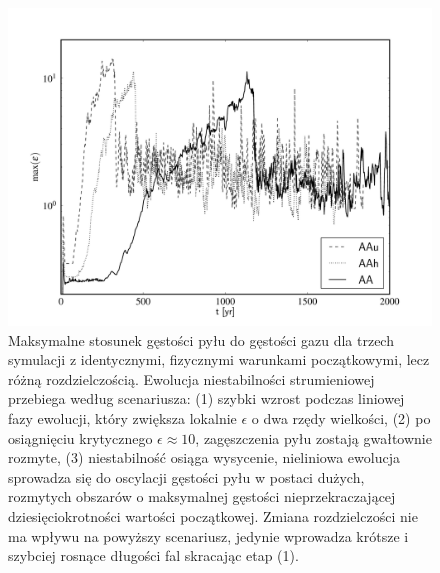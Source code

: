 \begin{figure}
   \includegraphics[width=0.98\linewidth]{figures/fig4}
   \caption{
      Maksymalne stosunek gęstości pyłu do gęstości gazu dla trzech symulacji z
      identycznymi, fizycznymi warunkami początkowymi, lecz różną
      rozdzielczością. Ewolucja niestabilności strumieniowej przebiega według
      scenariusza: (1) szybki wzrost podczas liniowej fazy ewolucji, który
      zwiększa lokalnie $\epsilon$ o dwa rzędy wielkości, (2) po
      osiągnięciu krytycznego $\epsilon\approx 10$, zagęszczenia pyłu zostają
      gwałtownie rozmyte, (3) niestabilność osiąga wysycenie, nieliniowa
      ewolucja sprowadza się do oscylacji gęstości pyłu w postaci dużych,
      rozmytych obszarów o maksymalnej gęstości nieprzekraczającej
      dziesięciokrotności wartości początkowej. Zmiana rozdzielczości nie ma
      wpływu na powyższy scenariusz, jedynie wprowadza krótsze i szybciej
   rosnące długości fal skracając etap (1).}

   \label{fig4}
\end{figure}
%

